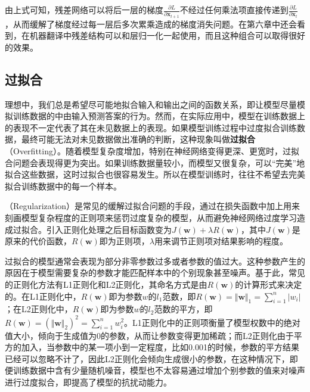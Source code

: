 \parinterval  由上式可知，残差网络可以将后一层的梯度$ \frac{\partial L}{\partial \mathbf x_{l+1}} $不经过任何乘法项直接传递到$ \frac{\partial L}{\partial \mathbf x_l} $，从而缓解了梯度经过每一层后多次累乘造成的梯度消失问题。在第六章中还会看到，在机器翻译中残差结构可以和层归一化一起使用，而且这种组合可以取得很好的效果。


\subsection{过拟合}\label{sec:5.4.5}

\parinterval  理想中，我们总是希望尽可能地拟合输入和输出之间的函数关系，即让模型尽量模拟训练数据的中由输入预测答案的行为。然而，在实际应用中，模型在训练数据上的表现不一定代表了其在未见数据上的表现。如果模型训练过程中过度拟合训练数据，最终可能无法对未见数据做出准确的判断，这种现象叫做{\small\sffamily\bfseries{过拟合}}（Overfitting）。随着模型复杂度增加，特别在神经网络变得更深、更宽时，过拟合问题会表现得更为突出。如果训练数据量较小，而模型又很复杂，可以``完美''地拟合这些数据，这时过拟合也很容易发生。所以在模型训练时，往往不希望去完美拟合训练数据中的每一个样本。

（Regularization）是常见的缓解过拟合问题的手段，通过在损失函数中加上用来刻画模型复杂程度的正则项来惩罚过度复杂的模型，从而避免神经网络过度学习造成过拟合。引入正则化处理之后目标函数变为$ J(\mathbf w)+\lambda R(\mathbf w) $，其中$ J(\mathbf w) $是原来的代价函数，$ R(\mathbf w) $即为正则项，$ \lambda $用来调节正则项对结果影响的程度。

\parinterval  过拟合的模型通常会表现为部分非零参数过多或者参数的值过大。这种参数产生的原因在于模型需要复杂的参数才能匹配样本中的个别现象甚至噪声。基于此，常见的正则化方法有L1正则化和L2正则化，其命名方式是由$ R(\mathbf w) $的计算形式来决定的。在L1正则化中，$ R(\mathbf w) $即为参数$ w $的$ l_1 $范数，即$ R(\mathbf w) ={\Vert \mathbf w\Vert}_1=\sum_{i=1}^{n}{\vert w_i\vert} $；在L2正则化中，$ R(\mathbf w) $即为参数$ w $的$ l_2 $范数的平方，即$ R(\mathbf w) =({\Vert \mathbf w\Vert}_2)^2=\sum_{i=1}^{n}{w_i^2} $。L1正则化中的正则项衡量了模型权数中的绝对值大小，倾向于生成值为0的参数，从而让参数变得更加稀疏；而L2正则化由于平方的加入，当参数中的某一项小到一定程度，比如0.001的时候，参数的平方结果已经可以忽略不计了，因此L2正则化会倾向生成很小的参数，在这种情况下，即便训练数据中含有少量随机噪音，模型也不太容易通过增加个别参数的值来对噪声进行过度拟合，即提高了模型的抗扰动能力。

